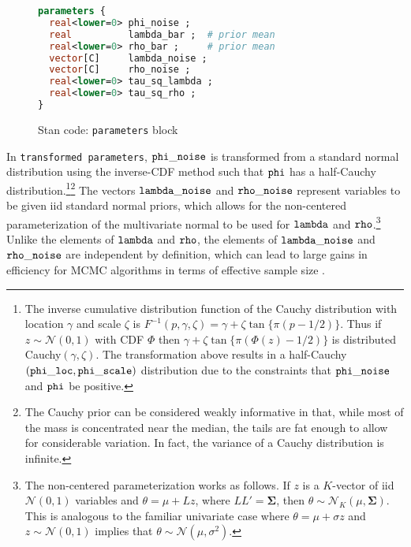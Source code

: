 \begin{figure}[h]
\begin{lstlisting}[language=Stan, frame=trBL]
parameters {
  real<lower=0> phi_noise ;    
  real          lambda_bar ;  # prior mean 
  real<lower=0> rho_bar ;     # prior mean 
  vector[C]     lambda_noise ;      
  vector[C]     rho_noise ;
  real<lower=0> tau_sq_lambda ;  
  real<lower=0> tau_sq_rho ;
}
\end{lstlisting}
\caption{Stan code: {\tt parameters} block}
\label{stan_parameters}
\end{figure}

In {\tt transformed parameters}, 
${\tt phi\_noise}$ is transformed from a standard normal 
distribution using the inverse-CDF method such that ${\tt phi}$ has a half-Cauchy 
distribution.\footnote{The inverse cumulative distribution function of the Cauchy distribution with 
location $\gamma$ and scale $\zeta$ is $F^{-1}(p, \gamma,\zeta)  = \gamma
+ \zeta \tan{\{ \pi (p - 1/2)\}}$. Thus if $z \sim \mathcal{N}(0,1)$ with CDF $\Phi$ then 
$\gamma + \zeta \tan{\{ \pi (\Phi(z) - 1/2)\}}$ is distributed 
Cauchy$(\gamma, \zeta)$. The transformation above results in a 
half-Cauchy$({\tt phi\_loc}, {\tt phi\_scale})$ 
distribution due to the constraints that ${\tt phi\_noise}$ and ${\tt phi}$ be positive.}\footnote{
The Cauchy prior can be considered weakly informative in that, while most of the mass is concentrated 
near the median, the tails are fat enough to allow for considerable variation. 
In fact, the variance of a Cauchy distribution is infinite.}
The vectors ${\tt lambda\_noise}$ and ${\tt rho\_noise}$ represent variables to be given iid standard normal
priors, which allows for the non-centered parameterization of the multivariate normal to be used for
${\tt lambda}$ and ${\tt rho}$.\footnote{The non-centered parameterization works as follows. If
$z$ is a $K$-vector of iid $\mathcal{N}(0,1)$ variables and $\theta = \mu + L z$, 
where $LL' = \boldsymbol{\Sigma}$, 
then $\theta \sim \mathcal{N}_K (\mu, \boldsymbol{\Sigma})$. This is analogous to the familiar univariate case 
where $\theta = \mu + \sigma z$ and $z \sim \mathcal{N}(0,1)$ implies that 
$\theta \sim \mathcal{N}(\mu, \sigma^2)$.} Unlike the elements of ${\tt lambda}$ and ${\tt rho}$, 
the elements of ${\tt lambda\_noise}$ and ${\tt rho\_noise}$ are independent by definition, 
which can lead to large gains in efficiency for MCMC algorithms in terms of effective sample 
size . 

